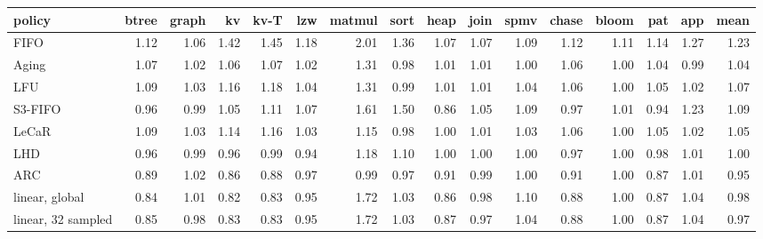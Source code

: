 \begin{tabular}{lrrrrrrrrrrrrrrr}
\toprule
policy & btree & graph & kv & kv-T & lzw & matmul & sort & heap & join & spmv & chase & bloom & pat & app & mean \\
\midrule
FIFO & 1.12 & 1.06 & 1.42 & 1.45 & 1.18 & 2.01 & 1.36 & 1.07 & 1.07 & 1.09 & 1.12 & 1.11 & 1.14 & 1.27 & 1.23 \\
Aging & 1.07 & 1.02 & 1.06 & 1.07 & 1.02 & 1.31 & 0.98 & 1.01 & 1.01 & 1.00 & 1.06 & 1.00 & 1.04 & 0.99 & 1.04 \\
LFU & 1.09 & 1.03 & 1.16 & 1.18 & 1.04 & 1.31 & 0.99 & 1.01 & 1.01 & 1.04 & 1.06 & 1.00 & 1.05 & 1.02 & 1.07 \\
S3-FIFO & 0.96 & 0.99 & 1.05 & 1.11 & 1.07 & 1.61 & 1.50 & 0.86 & 1.05 & 1.09 & 0.97 & 1.01 & 0.94 & 1.23 & 1.09 \\
LeCaR & 1.09 & 1.03 & 1.14 & 1.16 & 1.03 & 1.15 & 0.98 & 1.00 & 1.01 & 1.03 & 1.06 & 1.00 & 1.05 & 1.02 & 1.05 \\
LHD & 0.96 & 0.99 & 0.96 & 0.99 & 0.94 & 1.18 & 1.10 & 1.00 & 1.00 & 1.00 & 0.97 & 1.00 & 0.98 & 1.01 & 1.00 \\
ARC & 0.89 & 1.02 & 0.86 & 0.88 & 0.97 & 0.99 & 0.97 & 0.91 & 0.99 & 1.00 & 0.91 & 1.00 & 0.87 & 1.01 & 0.95 \\
linear, global & 0.84 & 1.01 & 0.82 & 0.83 & 0.95 & 1.72 & 1.03 & 0.86 & 0.98 & 1.10 & 0.88 & 1.00 & 0.87 & 1.04 & 0.98 \\
linear, 32 sampled & 0.85 & 0.98 & 0.83 & 0.83 & 0.95 & 1.72 & 1.03 & 0.87 & 0.97 & 1.04 & 0.88 & 1.00 & 0.87 & 1.04 & 0.97 \\
\bottomrule
\end{tabular}
